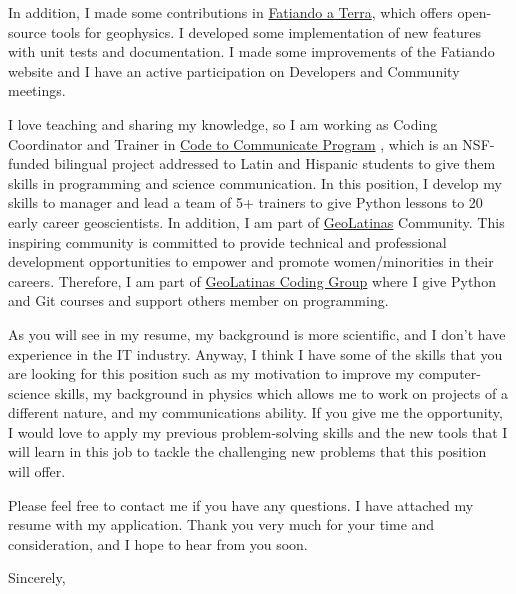 \documentclass[a4paper]{letter}
\newcommand{\coco}{%
    \href{https://www.codecommunicate.org/}{Code to Communicate Program}%
}
\newcommand{\fatiando}{\href{https://www.fatiando.org/}{Fatiando a Terra}}
\newcommand{\geolatinas}{\href{https://geolatinas.org/}{GeoLatinas}}
\newcommand{\geolatinascoding}{
    \href{https://geolatinas.github.io/}{GeoLatinas Coding Group}
}
\begin{document}
\begin{letter}{}
    In addition, I made some contributions in \fatiando{}, which offers
    open-source tools for geophysics.
    I developed some implementation of new features with unit tests and
    documentation.
    I made some improvements of the Fatiando website and I have an active
    participation on Developers and Community meetings.

    I love teaching and sharing my knowledge, so I am working as Coding
    Coordinator and Trainer in \coco, which is an NSF-funded bilingual project
    addressed to Latin and Hispanic students to give them skills in programming
    and science communication.
    In this position, I develop my skills to manager and lead a team of 5+
    trainers to give Python lessons to 20 early career geoscientists.
    In addition, I am part of \geolatinas{} Community.
    This inspiring community is committed to provide technical and
    professional development opportunities to empower and promote
    women/minorities in their careers.
    Therefore, I am part of \geolatinascoding{} where I give Python and Git
    courses and support others member on programming.

    As you will see in my resume, my background is more scientific, and I don’t
    have experience in the IT industry.
    Anyway, I think I have some of the skills that you are looking for this
    position such as my motivation to improve my computer-science skills, my
    background in physics which allows me to work on projects of a different
    nature, and my communications ability.
    If you give me the opportunity, I would love to apply my previous
    problem-solving skills and the new tools that I will learn in this job to
    tackle the challenging new problems that this position will offer.

    Please feel free to contact me if you have any questions.
    I have attached my resume with my application.
    Thank you very much for your time and consideration, and I hope to hear
    from you soon.

\closing{Sincerely,}

\end{letter}
\end{document}
